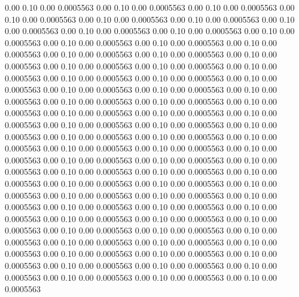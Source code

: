    0.00    0.10    0.00   0.0005563
   0.00    0.10    0.00   0.0005563
   0.00    0.10    0.00   0.0005563
   0.00    0.10    0.00   0.0005563
   0.00    0.10    0.00   0.0005563
   0.00    0.10    0.00   0.0005563
   0.00    0.10    0.00   0.0005563
   0.00    0.10    0.00   0.0005563
   0.00    0.10    0.00   0.0005563
   0.00    0.10    0.00   0.0005563
   0.00    0.10    0.00   0.0005563
   0.00    0.10    0.00   0.0005563
   0.00    0.10    0.00   0.0005563
   0.00    0.10    0.00   0.0005563
   0.00    0.10    0.00   0.0005563
   0.00    0.10    0.00   0.0005563
   0.00    0.10    0.00   0.0005563
   0.00    0.10    0.00   0.0005563
   0.00    0.10    0.00   0.0005563
   0.00    0.10    0.00   0.0005563
   0.00    0.10    0.00   0.0005563
   0.00    0.10    0.00   0.0005563
   0.00    0.10    0.00   0.0005563
   0.00    0.10    0.00   0.0005563
   0.00    0.10    0.00   0.0005563
   0.00    0.10    0.00   0.0005563
   0.00    0.10    0.00   0.0005563
   0.00    0.10    0.00   0.0005563
   0.00    0.10    0.00   0.0005563
   0.00    0.10    0.00   0.0005563
   0.00    0.10    0.00   0.0005563
   0.00    0.10    0.00   0.0005563
   0.00    0.10    0.00   0.0005563
   0.00    0.10    0.00   0.0005563
   0.00    0.10    0.00   0.0005563
   0.00    0.10    0.00   0.0005563
   0.00    0.10    0.00   0.0005563
   0.00    0.10    0.00   0.0005563
   0.00    0.10    0.00   0.0005563
   0.00    0.10    0.00   0.0005563
   0.00    0.10    0.00   0.0005563
   0.00    0.10    0.00   0.0005563
   0.00    0.10    0.00   0.0005563
   0.00    0.10    0.00   0.0005563
   0.00    0.10    0.00   0.0005563
   0.00    0.10    0.00   0.0005563
   0.00    0.10    0.00   0.0005563
   0.00    0.10    0.00   0.0005563
   0.00    0.10    0.00   0.0005563
   0.00    0.10    0.00   0.0005563
   0.00    0.10    0.00   0.0005563
   0.00    0.10    0.00   0.0005563
   0.00    0.10    0.00   0.0005563
   0.00    0.10    0.00   0.0005563
   0.00    0.10    0.00   0.0005563
   0.00    0.10    0.00   0.0005563
   0.00    0.10    0.00   0.0005563
   0.00    0.10    0.00   0.0005563
   0.00    0.10    0.00   0.0005563
   0.00    0.10    0.00   0.0005563
   0.00    0.10    0.00   0.0005563
   0.00    0.10    0.00   0.0005563
   0.00    0.10    0.00   0.0005563
   0.00    0.10    0.00   0.0005563
   0.00    0.10    0.00   0.0005563
   0.00    0.10    0.00   0.0005563
   0.00    0.10    0.00   0.0005563
   0.00    0.10    0.00   0.0005563
   0.00    0.10    0.00   0.0005563
   0.00    0.10    0.00   0.0005563
   0.00    0.10    0.00   0.0005563
   0.00    0.10    0.00   0.0005563
   0.00    0.10    0.00   0.0005563
